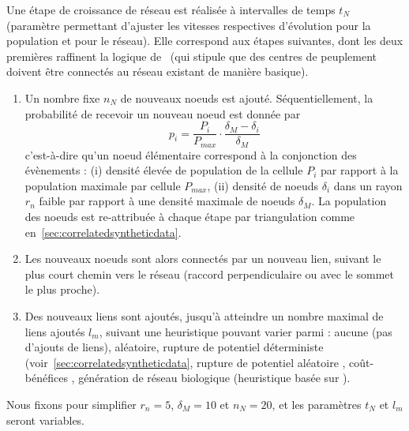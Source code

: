 


Une étape de croissance de réseau est réalisée à intervalles de temps $t_N$ (paramètre permettant d'ajuster les vitesses respectives d'évolution pour la population et pour le réseau). Elle correspond aux étapes suivantes, dont les deux premières raffinent la logique de~\cite{raimbault2014hybrid} (qui stipule que des centres de peuplement doivent être connectés au réseau existant de manière basique).

\begin{enumerate}
	\item Un nombre fixe $n_N$ de nouveaux noeuds est ajouté. Séquentiellement, la probabilité de recevoir un nouveau noeud est donnée par
\[
p_i = \frac{P_i}{P_{max}} \cdot \frac{\delta_M - \delta_i}{\delta_M}
\]
c'est-à-dire qu'un noeud élémentaire correspond à la conjonction des évènements : (i) densité élevée de population de la cellule $P_i$ par rapport à la population maximale par cellule $P_{max}$, (ii) densité de noeuds $\delta_i$ dans un rayon $r_n$ faible par rapport à une densité maximale de noeuds $\delta_M$. La population des noeuds est re-attribuée à chaque étape par triangulation comme en~\ref{sec:correlatedsyntheticdata}.
	\item Les nouveaux noeuds sont alors connectés par un nouveau lien, suivant le plus court chemin vers le réseau (raccord perpendiculaire ou avec le sommet le plus proche).
	\item Des nouveaux liens sont ajoutés, jusqu'à atteindre un nombre maximal de liens ajoutés $l_{m}$, suivant une heuristique pouvant varier parmi :  aucune (pas d'ajouts de liens), aléatoire, rupture de potentiel déterministe (voir~\ref{sec:correlatedsyntheticdata}, rupture de potentiel aléatoire \cite{schmitt2014modelisation}, coût-bénéfices \cite{louf2013emergence}, génération de réseau biologique (heuristique basée sur \cite{tero2010rules}).
\end{enumerate}


Nous fixons pour simplifier $r_n = 5$, $\delta_M = 10$ et $n_N=20$, et les paramètres $t_N$ et $l_m$ seront variables.



